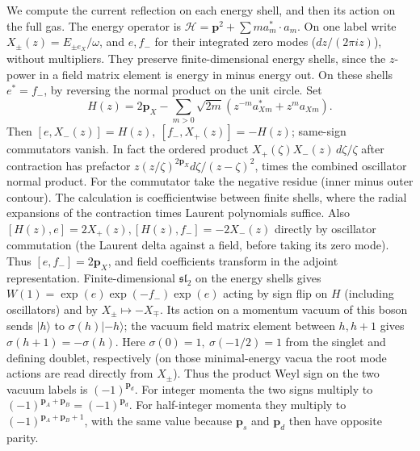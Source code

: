 We compute the current reflection on each energy shell, and then its action on the full gas. The energy operator is \(\mathcal H=\mathbf p^2+\sum m a_m^*\cdot a_m\). On one label write \(X_\pm(z)=E_{\pm e_X}/\omega\), and \(e,f_-\) for their integrated zero modes (\(dz/(2\pi i z)\)), without multipliers. They preserve finite-dimensional energy shells, since the \(z\)-power in a field matrix element is energy in minus energy out. On these shells \(e^*=f_-\), by reversing the normal product on the unit circle. Set
\[
 H(z)=2\mathbf p_X-\sum_{m>0}\sqrt{2m}(z^{-m}a_{Xm}^*+z^m a_{Xm}).
\]
Then \([e,X_-(z)]=H(z),\ [f_-,X_+(z)]=-H(z)\); same-sign commutators vanish. In fact the ordered product \(X_+(\zeta)X_-(z)\,d\zeta/\zeta\) after contraction has prefactor \(z(z/\zeta)^{2\mathbf p_X}d\zeta/(z-\zeta)^2\), times the combined oscillator normal product. For the commutator take the negative residue (inner minus outer contour). The calculation is coefficientwise between finite shells, where the radial expansions of the contraction times Laurent polynomials suffice. Also \([H(z),e]=2X_+(z), [H(z),f_-]=-2X_-(z)\) directly by oscillator commutation (the Laurent delta against a field, before taking its zero mode). Thus \([e,f_-]=2\mathbf p_X\), and field coefficients transform in the adjoint representation. Finite-dimensional \(\mathfrak{sl}_2\) on the energy shells gives \(W(1)=\exp(e)\exp(-f_-)\exp(e)\) acting by sign flip on \(H\) (including oscillators) and by \(X_\pm\mapsto-X_\mp\). Its action on a momentum vacuum of this boson sends \(|h\rangle\) to \(\sigma(h)|-h\rangle\); the vacuum field matrix element between \(h,h+1\) gives \(\sigma(h+1)=-\sigma(h)\). Here \(\sigma(0)=1,\ \sigma(-1/2)=1\) from the singlet and defining doublet, respectively (on those minimal-energy vacua the root mode actions are read directly from \(X_\pm\)). Thus the product Weyl sign on the two vacuum labels is
\((-1)^{\mathbf p_d}\). For integer momenta the two signs multiply to
\((-1)^{\mathbf p_A+\mathbf p_B}=(-1)^{\mathbf p_d}\).
For half-integer momenta they multiply to
\((-1)^{\mathbf p_A+\mathbf p_B+1}\), with the same value because
\(\mathbf p_s\) and \(\mathbf p_d\) then have opposite parity.

